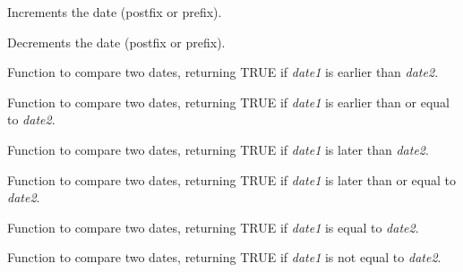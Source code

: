 Increments the date (postfix or prefix).



Decrements the date (postfix or prefix).



Function to compare two dates, returning TRUE if {\it date1} is earlier than {\it date2}.



Function to compare two dates, returning TRUE if {\it date1} is earlier than or equal to {\it date2}.



Function to compare two dates, returning TRUE if {\it date1} is later than {\it date2}.



Function to compare two dates, returning TRUE if {\it date1} is later than or equal to {\it date2}.



Function to compare two dates, returning TRUE if {\it date1} is equal to {\it date2}.



Function to compare two dates, returning TRUE if {\it date1} is not equal to {\it date2}.



